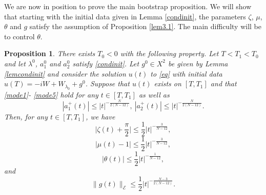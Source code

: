 \documentclass[a4paper,two-side,10pt]{amsart}
\newtheorem{prop}{Proposition}[section]
\numberwithin{equation}{section}
\begin{document}
We are now in position to prove the main bootstrap proposition. We will show that starting with the initial data given in Lemma \ref{condinit}, the parameters $\zeta$, $\mu$, $\theta$ and $g$ satisfy the assumption of Proposition \ref{lem3.1}. The main difficulty will be to control $\theta$.

\begin{prop}\label{4-4}
There exists $T_0<0$ with the following property. Let $T<T_1<T_0$ and let $\lambda^0$, $a_1^0$ and $a_2^0$ satisfy \eqref{condinit}. Let $g^0 \in X^2$ be given by Lemma \ref{lemcondinit} and consider the solution $u(t)$ to \eqref{eq} with initial data $u(T)=-iW+W_{\lambda_0}+g^0$. Suppose that $u(t)$ exists on $[T,T_1]$ and that \eqref{mode1}- \eqref{mode5} hold for any $t\in [T,T_1]$ as well as
\begin{equation}
\label{lastcondai}
|a_1^+ (t)| \leq |t|^{-\frac{N}{2(N-12)}},\ |a_2^+ (t)|\leq |t|^{-\frac{N}{2(N-12)}} .
\end{equation}
Then, for any $t\in [T,T_1]$, we have
\begin{equation}
\label{lastconde1}
\big|\zeta (t) +\frac{\pi}{2}\big| \leq \frac{1}{2} |t|^{-\frac{3}{N-12}},
\end{equation}
\begin{equation}
\label{lastconde2}
|\mu (t) -1|\leq \frac{1}{2} |t|^{-\frac{3}{N-12}},
\end{equation}
\begin{equation}
\label{lastconde3}
|\theta (t)|\leq \frac{1}{2} |t|^{-\frac{1}{N-12}},
\end{equation}
and
\begin{equation}
\label{lastconde4}
\|g(t)\|_{\mathcal{E}} \leq \frac{1}{2}|t|^{- \frac{N-3}{2(N-12)}}.
\end{equation}

\end{prop} 
\end{document}
